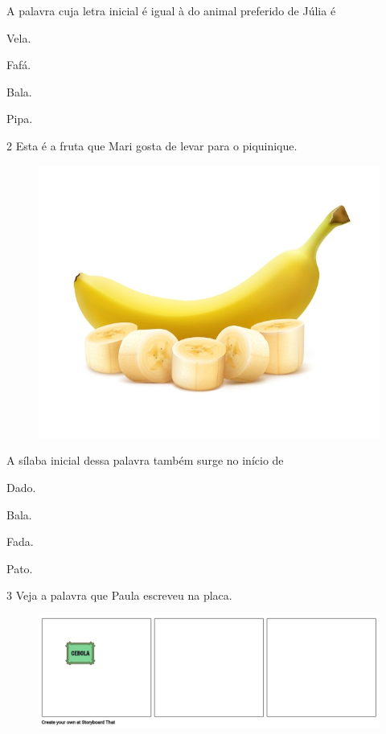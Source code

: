 
A palavra cuja letra inicial é igual à do animal preferido de Júlia é

\begin{escolha}
\item Vela.

\item Fafá.

\item Bala.

\item Pipa.
\end{escolha}

\num{2} Esta é a fruta que Mari gosta de levar para o piquinique.

\begin{figure}[htpb!]
\centering
\includegraphics[width=.5\textwidth]{media/image175.jpeg}
\end{figure}


A sílaba inicial dessa palavra também surge no início de

\begin{escolha}
\item Dado.

\item Bala.

\item Fada.

\item Pato.
\end{escolha}

\num{3} Veja a palavra que Paula escreveu na placa.

\begin{figure}[htpb!]
\centering
\includegraphics[width=.5\textwidth]{media/image176.png}
\end{figure}

